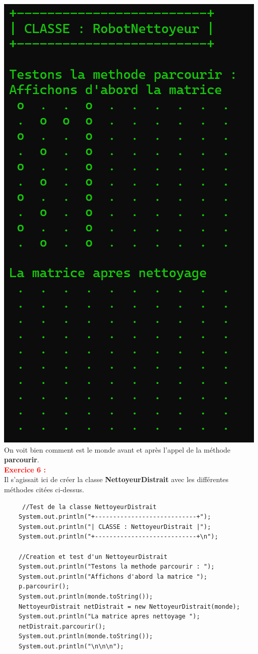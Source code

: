 \documentclass{article}
\begin{document}
\includegraphics[scale=0.7]{../images/exo6.png}\\
On voit bien comment est le monde avant et après l'appel de la méthode \textbf{parcourir}.\\

\textcolor{red}{\textbf{\Large{Exercice 6 :}}}\\
Il s'agissait ici de créer la classe \textbf{NettoyeurDistrait} avec les différentes méthodes citées ci-dessus.\\
\begin{lstlisting}
	 //Test de la classe NettoyeurDistrait
	System.out.println("+----------------------------+");
	System.out.println("| CLASSE : NettoyeurDistrait |");
	System.out.println("+----------------------------+\n");
	
	//Creation et test d'un NettoyeurDistrait
	System.out.println("Testons la methode parcourir : ");
	System.out.println("Affichons d'abord la matrice ");
	p.parcourir();
	System.out.println(monde.toString());
	NettoyeurDistrait netDistrait = new NettoyeurDistrait(monde);
	System.out.println("La matrice apres nettoyage ");
	netDistrait.parcourir();
	System.out.println(monde.toString());
	System.out.println("\n\n\n");
\end{lstlisting}
\end{document}
